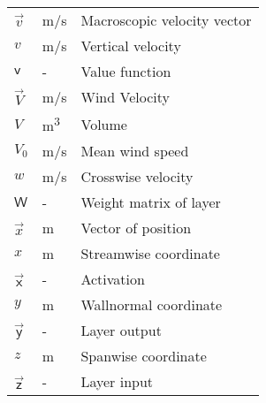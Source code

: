 \begin{longtable}{p{5cm}p{4cm}p{5cm}}
    $\vec{v}$               & \si{m/s}    & Macroscopic velocity vector \\
    $v$                     & \si{m/s}    & Vertical velocity \\    
    $\mathsf{v}$			& \si{-}		& Value function \\
    $\vec{V}$				& \si{m/s}	& Wind Velocity \\
    $V$						& \si{m\cubed}	& Volume \\
    $V_0$					& \si{m/s}	& Mean wind speed \\
    $w$                     & \si{m/s}    & Crosswise velocity \\
    $\mathsf{W}$			& \si{-}		& Weight matrix of layer \\
    $\vec{x}$               & \si{m}      & Vector of position \\
    $x$                     & \si{m}      & Streamwise coordinate \\
    $\vec{\mathsf{x}}$		& \si{-}		& Activation \\
    $y$                     & \si{m}      & Wallnormal coordinate \\
    $\vec{\mathsf{y}}$		& \si{-}		& Layer output \\	
    $z$                     & \si{m}      & Spanwise coordinate \\
    $\vec{\mathsf{z}}$		& \si{-}		& Layer input \\
\end{longtable}

